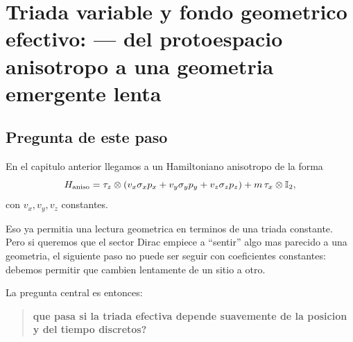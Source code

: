 \chapter{Triada variable y fondo geometrico efectivo: --- del protoespacio anisotropo a una geometria emergente lenta}
\label{ch:triada-variable-fondo-geometrico}







\begin{abstract}
Despues de estudiar anisotropias controladas constantes, el paso natural es permitir que los coeficientes efectivos varien lentamente en el protoespacio. Este documento formula, de manera pedagógica y prudente, la idea de una triada efectiva \(e^a{}_i(\vx,n)\) dependiente de la posicion discreta y del tiempo discreto. El objetivo no es derivar todavia una teoria completa de fermiones en espacio curvo, sino mostrar como una variacion lenta del paso microscopico induce un Hamiltoniano de Dirac con coeficientes espaciales variables, y por que eso puede leerse como la primera huella de un fondo geometrico emergente.
\end{abstract}

\section{Pregunta de este paso}
En el capitulo anterior llegamos a un Hamiltoniano anisotropo de la forma
\begin{equation}
H_{\mathrm{aniso}}
=
\tau_z\otimes\left(v_x\sigma_x p_x + v_y\sigma_y p_y + v_z\sigma_z p_z\right)
+ m\,\tau_x\otimes\mathbb{I}_2,
\end{equation}
con \(v_x,v_y,v_z\) constantes.

Eso ya permitia una lectura geometrica en terminos de una triada constante. Pero si queremos que el sector Dirac empiece a \enquote{sentir} algo mas parecido a una geometria, el siguiente paso no puede ser seguir con coeficientes constantes: debemos permitir que cambien lentamente de un sitio a otro.

La pregunta central es entonces:
\begin{quote}
\textbf{que pasa si la triada efectiva depende suavemente de la posicion y del tiempo discretos?}
\end{quote}

